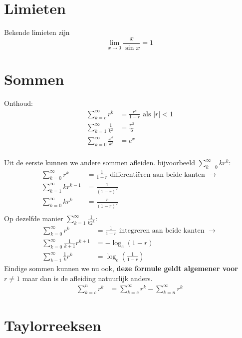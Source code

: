 \documentclass{article}
\begin{document}
	\tableofcontents
	\newpage

	\section{Limieten}
    Bekende limieten zijn
    \[
        \lim_{x\to 0} \frac{x}{\sin x} = 1
    \]
	\section{Sommen}
 		Onthoud:
 		\begin{align*}
 			\sum_{k=c}^{\infty} r^k &= \frac{r^c}{1-r} \text{ als $|r|<1$}\\
 			\sum_{k=1}^{\infty} \frac{1}{k^2} &= \frac{\pi^2}{6} \\
 			\sum_{k=0}^\infty \frac{x^k}{k!} &= e^x \\
 		\end{align*}
 		
 		Uit de eerste kunnen we andere sommen afleiden. bijvoorbeeld 
 		$\displaystyle \sum_{k=0}^{\infty} kr^k: $
 		\begin{align*}
 				\sum_{k=0}^{\infty} r^k &= \frac{1}{1-r} \text { differenti\"eren aan beide kanten } \to \\
 				\sum_{k=1}^{\infty} kr^{k-1} &= \frac{1}{(1-r)^2} \\
 				\sum_{k=0}^{\infty} kr^k &= \frac{r}{(1-r)^2} \\
 		\end{align*}
 		Op dezelfde manier $\displaystyle \sum_{k=1}^{\infty} \frac{1}{k2^k}$:
 		\begin{align*}
 				\sum_{k=0}^{\infty} r^k &= \frac{1}{1-r} \text { integreren aan beide kanten } \to \\
 				\sum_{k=0}^{\infty} \frac{1}{k+1} r^{k+1} &= -\log_e (1-r) \\
 				\sum_{k-1}^\infty \frac{1}{k} r^k &= \log_e (\frac{1}{1-r})
 		\end{align*}
 		Eindige sommen kunnen we nu ook, \textbf{deze formule geldt algemener voor $r\neq 1$} maar dan is de afleiding natuurlijk anders.
 		\begin{align*}
 			\sum_{k=c}^n r^k &= \sum_{k=c}^\infty r^k - \sum_{k=n}^\infty r^k
 		\end{align*}

\section{Taylorreeksen}
\end{document}
